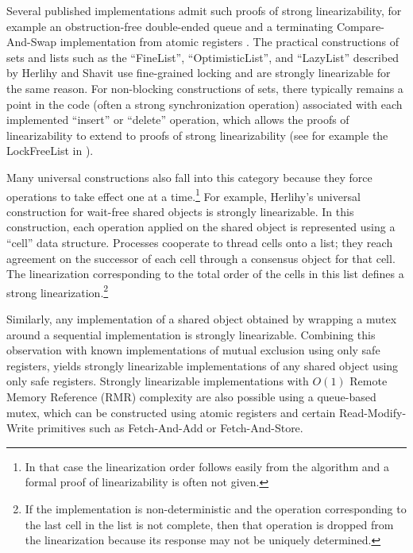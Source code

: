 \documentclass[11pt,letterpaper]{article}
\renewcommand{\O}{\ensuremath{{O}}}
\begin{document}
Several published implementations admit such proofs of strong linearizability, for example an obstruction-free double-ended queue \cite{her:of}
and a terminating Compare-And-Swap implementation from atomic registers \cite{ghhw:cas}.
The practical constructions of sets and lists such as the ``FineList'', ``OptimisticList'', and ``LazyList''
described by Herlihy and Shavit
\cite{hs:art} use fine-grained locking and are strongly linearizable for the same reason.
For non-blocking constructions of sets,
there typically remains a point in the code (often a strong synchronization operation) associated with each
 implemented ``insert''  or ``delete'' operation, which allows the proofs of linearizability to extend to
 proofs of strong linearizability (see for example the LockFreeList in \cite{hs:art}).

Many universal constructions also fall into this category because they force operations to take effect one at a time.\footnote{
In that case the linearization order follows easily from the algorithm and a formal proof
  of linearizability is often not given.}
For example, Herlihy's universal construction for wait-free shared objects \cite{herl:wait} is strongly linearizable.
In this construction, each operation applied on the shared object is represented using a ``cell'' data structure.
Processes cooperate to thread cells onto a list;
they reach agreement on the successor of each cell through a consensus object for that cell.
The linearization corresponding to the total order of the cells in this list defines a strong linearization.\footnote{
If the implementation is non-deterministic and the operation corresponding to the last cell in the list is not complete, then
          that operation is dropped from the linearization because its response may not be uniquely determined.}



Similarly, any implementation of a shared object obtained by wrapping a mutex around a sequential implementation
is strongly linearizable.
Combining this observation with known implementations of mutual exclusion using only safe registers,
yields strongly linearizable implementations of any shared object using only safe registers.
Strongly linearizable implementations with $\O(1)$ Remote Memory Reference (RMR) complexity are also possible using a queue-based mutex,
which can be constructed using atomic registers and certain Read-Modify-Write primitives such as
Fetch-And-Add or Fetch-And-Store.
\end{document}
